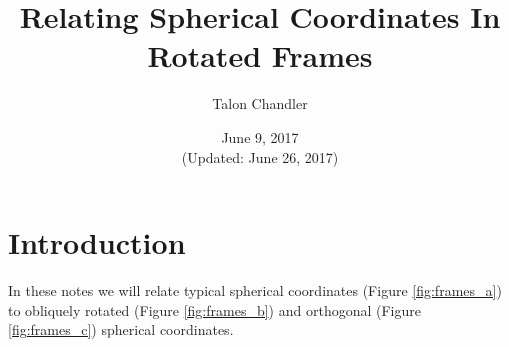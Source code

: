\documentclass[11pt]{article}
\begin{document}
\title{\vspace{-2.5em} Relating Spherical Coordinates In Rotated Frames\vspace{-1em}} \author{Talon Chandler}%
\date{\vspace{-1em}June 9, 2017\\ (Updated: June 26, 2017)\vspace{-1em}}
\maketitle

\section{Introduction}
In these notes we will relate typical spherical coordinates (Figure
\ref{fig:frames_a}) to obliquely rotated (Figure \ref{fig:frames_b}) and
orthogonal (Figure \ref{fig:frames_c}) spherical coordinates.
\end{document}
